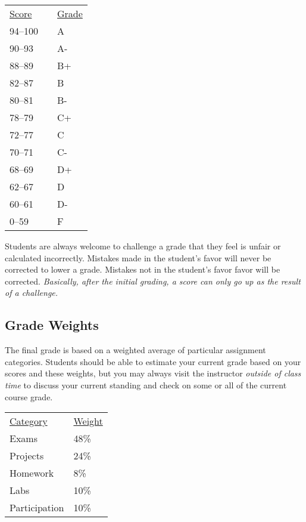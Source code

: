 \documentclass[10pt]{article}
\begin{document}
\begin{center}
\begin{small}
\begin{tabular}{lcl}
\underline{Score} & & \underline{Grade} \\
94--100 & & A \\
90--93 & & A- \\
88--89 & & B+ \\
82--87 & & B \\
80--81 & & B- \\
78--79 & & C+ \\
72--77 & & C \\
70--71 & & C- \\
68--69 & & D+ \\
62--67 & & D \\
60--61 & & D- \\
0--59 & & F
\end{tabular}
\end{small}
\end{center}


Students are always welcome to challenge a grade that they feel is unfair or calculated incorrectly.  Mistakes made in the student's favor will never be corrected to lower a grade.  Mistakes not in the student's favor favor will be corrected.  \textit{Basically, after the initial grading, a score can only go up as the result of a challenge.}



\subsection{Grade Weights}

The final grade is based on a weighted average of particular assignment categories.  Students should be able to estimate your current grade based on your scores and these weights, but you may always visit the instructor \textit{outside of class time} to discuss your current standing and check on some or all of the current course grade.

\begin{center}
  \begin{tabular}{ll}
  \underline{Category} & \underline{Weight} \\
    Exams & 48\% \\ %
    Projects & 24\% \\ %
    Homework & 8\% \\ %
    Labs & 10\% \\ %
    Participation & 10\%
  \end{tabular}
\end{center}
\end{document}
